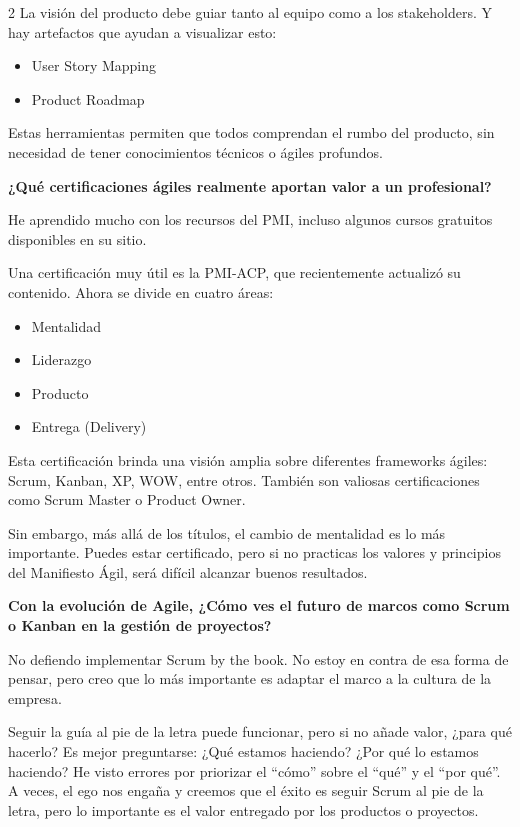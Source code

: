 \documentclass[12pt,spanish,Letterpaper,openany]{book}
\providecommand{\tightlist}{%
  \setlength{\itemsep}{0pt}\setlength{\parskip}{0pt}}
\begin{document}
\begin {multicols}{2}
La visión del producto debe guiar tanto al equipo como a los stakeholders. Y hay artefactos que ayudan a visualizar esto:

\begin{itemize}
\tightlist
\item
  User Story Mapping
\item
  Product Roadmap
\end{itemize}

Estas herramientas permiten que todos comprendan el rumbo del producto, sin necesidad de tener conocimientos técnicos o ágiles profundos.

\textbf{¿Qué certificaciones ágiles realmente aportan valor a un profesional?}

He aprendido mucho con los recursos del PMI, incluso algunos cursos gratuitos disponibles en su sitio.

Una certificación muy útil es la PMI-ACP, que recientemente actualizó su contenido. Ahora se divide en cuatro áreas:

\begin{itemize}
\tightlist
\item
  Mentalidad
\item
  Liderazgo
\item
  Producto
\item
  Entrega (Delivery)
\end{itemize}

Esta certificación brinda una visión amplia sobre diferentes frameworks ágiles: Scrum, Kanban, XP, WOW, entre otros. También son valiosas certificaciones como Scrum Master o Product Owner.

Sin embargo, más allá de los títulos, el cambio de mentalidad es lo más importante. Puedes estar certificado, pero si no practicas los valores y principios del Manifiesto Ágil, será difícil alcanzar buenos resultados.

\textbf{Con la evolución de Agile, ¿Cómo ves el futuro de marcos como Scrum o Kanban en la gestión de proyectos?}

No defiendo implementar Scrum by the book. No estoy en contra de esa forma de pensar, pero creo que lo más importante es adaptar el marco a la cultura de la empresa.

Seguir la guía al pie de la letra puede funcionar, pero si no añade valor, ¿para qué hacerlo? Es mejor preguntarse: ¿Qué estamos haciendo?
¿Por qué lo estamos haciendo? He visto errores por priorizar el ``cómo'' sobre el ``qué'' y el ``por qué''. A veces, el ego nos engaña y creemos que el éxito es seguir Scrum al pie de la letra, pero lo importante es el valor entregado por los productos o proyectos.


\end{multicols}
\end{document}
